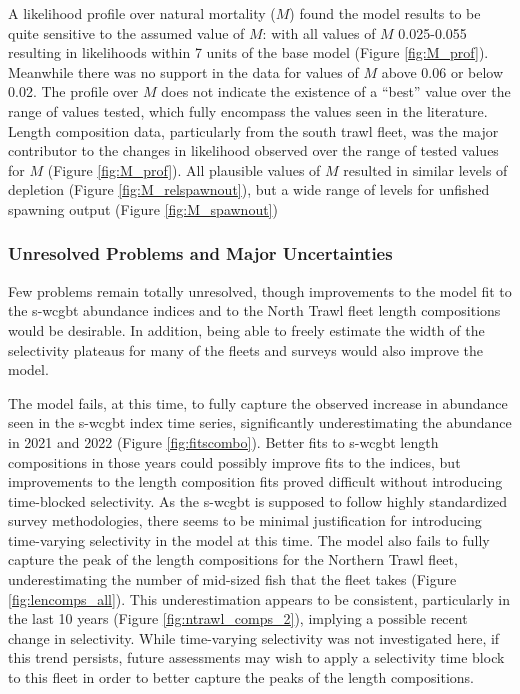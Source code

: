 \documentclass[11pt,
  english,
  letterpaper,
]{article}
\begin{document}
A likelihood profile over natural mortality (\(M\)) found the model results to be quite sensitive to the assumed value of \(M\): with all values of \(M\) 0.025-0.055 resulting in likelihoods within 7 units of the base model (Figure \ref{fig:M_prof}). Meanwhile there was no support in the data for values of \(M\) above 0.06 or below 0.02. The profile over \(M\) does not indicate the existence of a ``best'' value over the range of values tested, which fully encompass the values seen in the literature. Length composition data, particularly from the south trawl fleet, was the major contributor to the changes in likelihood observed over the range of tested values for \(M\) (Figure \ref{fig:M_prof}). All plausible values of \(M\) resulted in similar levels of depletion (Figure \ref{fig:M_relspawnout}), but a wide range of levels for unfished spawning output (Figure \ref{fig:M_spawnout})

\hypertarget{unresolved-problems-and-major-uncertainties-1}{%
\subsubsection{Unresolved Problems and Major Uncertainties}\label{unresolved-problems-and-major-uncertainties-1}}

Few problems remain totally unresolved, though improvements to the model fit to the \gls{s-wcgbt} abundance indices and to the North Trawl fleet length compositions would be desirable. In addition, being able to freely estimate the width of the selectivity plateaus for many of the fleets and surveys would also improve the model.

The model fails, at this time, to fully capture the observed increase in abundance seen in the \gls{s-wcgbt} index time series, significantly underestimating the abundance in 2021 and 2022 (Figure \ref{fig:fitscombo}). Better fits to \gls{s-wcgbt} length compositions in those years could possibly improve fits to the indices, but improvements to the length composition fits proved difficult without introducing time-blocked selectivity. As the \gls{s-wcgbt} is supposed to follow highly standardized survey methodologies, there seems to be minimal justification for introducing time-varying selectivity in the model at this time. The model also fails to fully capture the peak of the length compositions for the Northern Trawl fleet, underestimating the number of mid-sized fish that the fleet takes (Figure \ref{fig:lencomps_all}). This underestimation appears to be consistent, particularly in the last 10 years (Figure \ref{fig:ntrawl_comps_2}), implying a possible recent change in selectivity. While time-varying selectivity was not investigated here, if this trend persists, future assessments may wish to apply a selectivity time block to this fleet in order to better capture the peaks of the length compositions.
\end{document}
